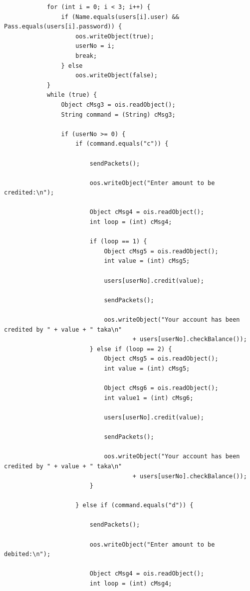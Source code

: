 \documentclass[11pt]{article}
\begin{document}
\begin{lstlisting}
            for (int i = 0; i < 3; i++) {
                if (Name.equals(users[i].user) && Pass.equals(users[i].password)) {
                    oos.writeObject(true);
                    userNo = i;
                    break;
                } else
                    oos.writeObject(false);
            }
            while (true) {
                Object cMsg3 = ois.readObject();
                String command = (String) cMsg3;

                if (userNo >= 0) {
                    if (command.equals("c")) {

                        sendPackets();

                        oos.writeObject("Enter amount to be credited:\n");

                        Object cMsg4 = ois.readObject();
                        int loop = (int) cMsg4;

                        if (loop == 1) {
                            Object cMsg5 = ois.readObject();
                            int value = (int) cMsg5;

                            users[userNo].credit(value);

                            sendPackets();

                            oos.writeObject("Your account has been credited by " + value + " taka\n"
                                    + users[userNo].checkBalance());
                        } else if (loop == 2) {
                            Object cMsg5 = ois.readObject();
                            int value = (int) cMsg5;

                            Object cMsg6 = ois.readObject();
                            int value1 = (int) cMsg6;

                            users[userNo].credit(value);

                            sendPackets();

                            oos.writeObject("Your account has been credited by " + value + " taka\n"
                                    + users[userNo].checkBalance());
                        }

                    } else if (command.equals("d")) {

                        sendPackets();

                        oos.writeObject("Enter amount to be debited:\n");

                        Object cMsg4 = ois.readObject();
                        int loop = (int) cMsg4;


\end{lstlisting}
\end{document}
